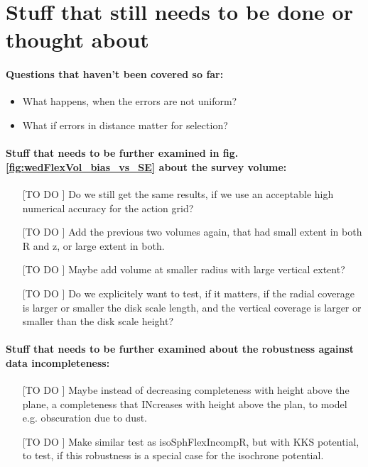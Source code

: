 \section{Stuff that still needs to be done or thought about}

\paragraph{Questions that haven't been covered so far:}
\begin{itemize}
\item What happens, when the errors are not uniform?
\item What if errors in distance matter for selection?
\end{itemize}

\paragraph{Stuff that needs to be further examined in fig. \ref{fig:wedFlexVol_bias_vs_SE} about the survey volume:}
\begin{itemize}
\item[[TO DO]] Do we still get the same results, if we use an acceptable high numerical accuracy for the action grid?
\item[[TO DO]] Add the previous two volumes again, that had small extent in both R and z, or large extent in both.
\item[[TO DO]] Maybe add volume at smaller radius with large vertical extent?
\item[[TO DO]] Do we explicitely want to test, if it matters, if the radial coverage is larger or smaller the disk scale length, and the vertical coverage is larger or smaller than the disk scale height?
\end{itemize}

\paragraph{Stuff that needs to be further examined about the robustness against data incompleteness:}
\begin{itemize}
\item[[TO DO]] Maybe instead of decreasing completeness with height above the plane, a completeness
that INcreases with height above the plan, to model e.g. obscuration due to dust.
\item[[TO DO]] Make similar test as isoSphFlexIncompR, but with KKS potential, to test, if this
robustness is a special case for the isochrone potential.
\end{itemize}

